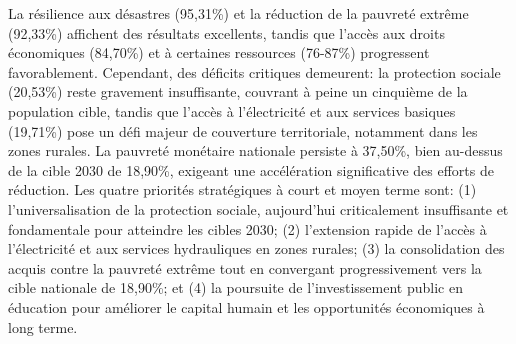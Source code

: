 La résilience aux désastres (95,31\%) et la réduction de la pauvreté extrême (92,33\%) affichent des résultats excellents, tandis que l'accès aux droits économiques (84,70\%) et à certaines ressources (76-87\%) progressent favorablement. Cependant, des déficits critiques demeurent: la protection sociale (20,53\%) reste gravement insuffisante, couvrant à peine un cinquième de la population cible, tandis que l'accès à l'électricité et aux services basiques (19,71\%) pose un défi majeur de couverture territoriale, notamment dans les zones rurales. La pauvreté monétaire nationale persiste à 37,50\%, bien au-dessus de la cible 2030 de 18,90\%, exigeant une accélération significative des efforts de réduction. Les quatre priorités stratégiques à court et moyen terme sont: (1) l'universalisation de la protection sociale, aujourd'hui criticalement insuffisante et fondamentale pour atteindre les cibles 2030; (2) l'extension rapide de l'accès à l'électricité et aux services hydrauliques en zones rurales; (3) la consolidation des acquis contre la pauvreté extrême tout en convergant progressivement vers la cible nationale de 18,90\%; et (4) la poursuite de l'investissement public en éducation pour améliorer le capital humain et les opportunités économiques à long terme.





















































